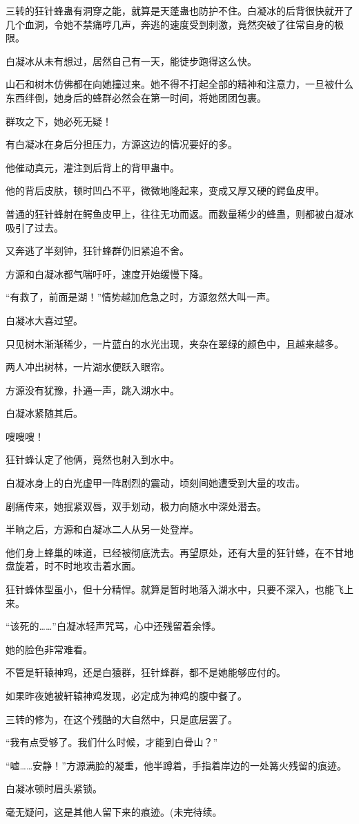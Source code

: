 \begin{this_body}
三转的狂针蜂蛊有洞穿之能，就算是天蓬蛊也防护不住。白凝冰的后背很快就开了几个血洞，令她不禁痛哼几声，奔逃的速度受到刺激，竟然突破了往常自身的极限。

白凝冰从未有想过，居然自己有一天，能徒步跑得这么快。

山石和树木仿佛都在向她撞过来。她不得不打起全部的精神和注意力，一旦被什么东西绊倒，她身后的蜂群必然会在第一时间，将她团团包裹。

群攻之下，她必死无疑！

有白凝冰在身后分担压力，方源这边的情况要好的多。

他催动真元，灌注到后背上的背甲蛊中。

他的背后皮肤，顿时凹凸不平，微微地隆起来，变成又厚又硬的鳄鱼皮甲。

普通的狂针蜂射在鳄鱼皮甲上，往往无功而返。而数量稀少的蜂蛊，则都被白凝冰吸引了过去。

又奔逃了半刻钟，狂针蜂群仍旧紧追不舍。

方源和白凝冰都气喘吁吁，速度开始缓慢下降。

“有救了，前面是湖！”情势越加危急之时，方源忽然大叫一声。

白凝冰大喜过望。

只见树木渐渐稀少，一片蓝白的水光出现，夹杂在翠绿的颜色中，且越来越多。

两人冲出树林，一片湖水便跃入眼帘。

方源没有犹豫，扑通一声，跳入湖水中。

白凝冰紧随其后。

嗖嗖嗖！

狂针蜂认定了他俩，竟然也射入到水中。

白凝冰身上的白光虚甲一阵剧烈的震动，顷刻间她遭受到大量的攻击。

剧痛传来，她抿紧双唇，双手划动，极力向随水中深处潜去。

半晌之后，方源和白凝冰二人从另一处登岸。

他们身上蜂巢的味道，已经被彻底洗去。再望原处，还有大量的狂针蜂，在不甘地盘旋着，时不时地攻击着水面。

狂针蜂体型虽小，但十分精悍。就算是暂时地落入湖水中，只要不深入，也能飞上来。

“该死的……”白凝冰轻声咒骂，心中还残留着余悸。

她的脸色非常难看。

不管是轩辕神鸡，还是白猿群，狂针蜂群，都不是她能够应付的。

如果昨夜她被轩辕神鸡发现，必定成为神鸡的腹中餐了。

三转的修为，在这个残酷的大自然中，只是底层罢了。

“我有点受够了。我们什么时候，才能到白骨山？”

“嘘……安静！”方源满脸的凝重，他半蹲着，手指着岸边的一处篝火残留的痕迹。

白凝冰顿时眉头紧锁。

毫无疑问，这是其他人留下来的痕迹。(未完待续。

\end{this_body}

